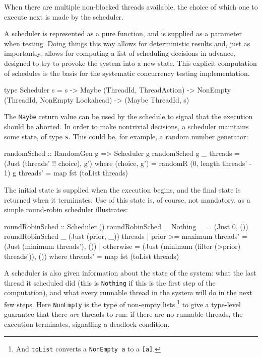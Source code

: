 When there are multiple non-blocked threads available, the choice of
which one to execute next is made by the scheduler.

A scheduler is represented as a pure function, and is supplied as a
parameter when testing. Doing things this way allows for deterministic
results and, just as importantly, allows for computing a list of
scheduling decisions in advance, designed to try to provoke the system
into a new state. This explicit computation of schedules is the basis
for the systematic concurrency testing implementation.

\begin{haskellcode}
type Scheduler s = s
  -> Maybe (ThreadId, ThreadAction)
  -> NonEmpty (ThreadId, NonEmpty Lookahead)
  -> (Maybe ThreadId, s)
\end{haskellcode}

The \verb|Maybe| return value can be used by the schedule to signal
that the execution should be aborted. In order to make nontrivial
decisions, a scheduler maintains some state, of type \verb|s|. This
could be, for example, a random number generator:

\begin{haskellcode}
randomSched :: RandomGen g => Scheduler g
randomSched g _ threads = (Just (threads' !! choice), g') where
  (choice, g') = randomR (0, length threads' - 1) g
  threads'     = map fst (toList threads)
\end{haskellcode}

The initial state is supplied when the execution begins, and the final
state is returned when it terminates. Use of this state is, of course,
not mandatory, as a simple round-robin scheduler illustrates:

\begin{haskellcode}
roundRobinSched :: Scheduler ()
roundRobinSched _ Nothing _ = (Just 0, ())
roundRobinSched _ (Just (prior, _)) threads
  | prior >= maximum threads' = (Just (minimum threads'), ())
  | otherwise = (Just (minimum (filter (>prior) threads')), ())
  where threads' = map fst (toList threads)
\end{haskellcode}

A scheduler is also given information about the state of the system:
what the last thread it scheduled did (this is \verb|Nothing| if this
is the first step of the computation), and what every runnable thread
in the system will do in the next few steps. Here \verb|NonEmpty| is
the type of non-empty lists,\footnote{And \texttt{toList} converts a
  \texttt{NonEmpty a} to a \texttt{[a]}.} to give a type-level
guarantee that there \emph{are} threads to run: if there are no
runnable threads, the execution terminates, signalling a deadlock
condition.

